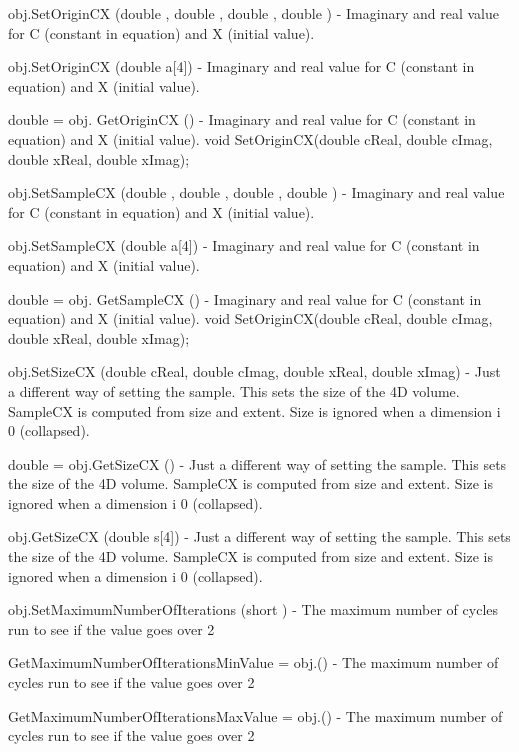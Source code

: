 \begin{DoxyItemize}
\item {\ttfamily obj.\-Set\-Origin\-C\-X (double , double , double , double )} -\/ Imaginary and real value for C (constant in equation) and X (initial value).  
\item {\ttfamily obj.\-Set\-Origin\-C\-X (double a\mbox{[}4\mbox{]})} -\/ Imaginary and real value for C (constant in equation) and X (initial value).  
\item {\ttfamily double = obj. Get\-Origin\-C\-X ()} -\/ Imaginary and real value for C (constant in equation) and X (initial value). void Set\-Origin\-C\-X(double c\-Real, double c\-Imag, double x\-Real, double x\-Imag);  
\item {\ttfamily obj.\-Set\-Sample\-C\-X (double , double , double , double )} -\/ Imaginary and real value for C (constant in equation) and X (initial value).  
\item {\ttfamily obj.\-Set\-Sample\-C\-X (double a\mbox{[}4\mbox{]})} -\/ Imaginary and real value for C (constant in equation) and X (initial value).  
\item {\ttfamily double = obj. Get\-Sample\-C\-X ()} -\/ Imaginary and real value for C (constant in equation) and X (initial value). void Set\-Origin\-C\-X(double c\-Real, double c\-Imag, double x\-Real, double x\-Imag);  
\item {\ttfamily obj.\-Set\-Size\-C\-X (double c\-Real, double c\-Imag, double x\-Real, double x\-Imag)} -\/ Just a different way of setting the sample. This sets the size of the 4\-D volume. Sample\-C\-X is computed from size and extent. Size is ignored when a dimension i 0 (collapsed).  
\item {\ttfamily double = obj.\-Get\-Size\-C\-X ()} -\/ Just a different way of setting the sample. This sets the size of the 4\-D volume. Sample\-C\-X is computed from size and extent. Size is ignored when a dimension i 0 (collapsed).  
\item {\ttfamily obj.\-Get\-Size\-C\-X (double s\mbox{[}4\mbox{]})} -\/ Just a different way of setting the sample. This sets the size of the 4\-D volume. Sample\-C\-X is computed from size and extent. Size is ignored when a dimension i 0 (collapsed).  
\item {\ttfamily obj.\-Set\-Maximum\-Number\-Of\-Iterations (short )} -\/ The maximum number of cycles run to see if the value goes over 2  
\item {\ttfamily Get\-Maximum\-Number\-Of\-Iterations\-Min\-Value = obj.()} -\/ The maximum number of cycles run to see if the value goes over 2  
\item {\ttfamily Get\-Maximum\-Number\-Of\-Iterations\-Max\-Value = obj.()} -\/ The maximum number of cycles run to see if the value goes over 2  

\end{DoxyItemize}
